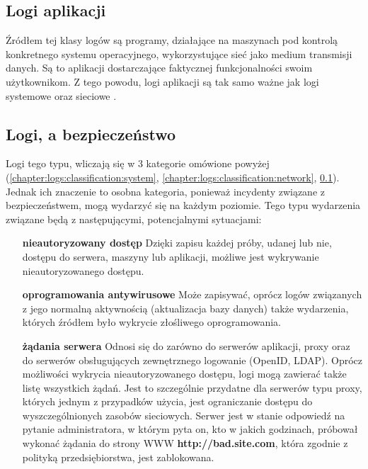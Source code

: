     \subsection{Logi aplikacji}
    \label{chapter:logs:classification:application}
    Źródłem tej klasy logów są programy, działające na maszynach pod kontrolą konkretnego
    systemu operacyjnego, wykorzystujące sieć jako medium transmisji danych. Są to
    aplikacji dostarczające faktycznej funkcjonalności swoim użytkownikom. Z tego powodu,
    logi aplikacji są tak samo ważne jak logi systemowe oraz sieciowe \cite{logging_log_management}. 
    
    \subsection{Logi, a bezpieczeństwo}
    \label{chapter:logs:classification:security}
    Logi tego typu, wliczają się w 3 kategorie omówione powyżej (\ref{chapter:logs:classification:system},
    \ref{chapter:logs:classification:network}, \ref{chapter:logs:classification:application}). Jednak
    ich znaczenie to osobna kategoria, ponieważ incydenty związane z bezpieczeństwem, mogą wydarzyć się
    na każdym poziomie. Tego typu wydarzenia związane będą z następującymi, potencjalnymi sytuacjami:
    \begin{itemize}
        \item[\textbf{nieautoryzowany dostęp}] Dzięki zapisu każdej próby, udanej lub nie, dostępu do serwera,
        maszyny lub aplikacji, możliwe jest wykrywanie nieautoryzowanego dostępu.
        \item[\textbf{oprogramowania antywirusowe}] Może zapisywać, oprócz logów związanych z jego normalną aktywnością
        (aktualizacja bazy danych) także wydarzenia, których źródłem było wykrycie złośliwego oprogramowania.
        \item[\textbf{żądania serwera}] Odnosi się do zarówno do serwerów aplikacji, proxy oraz do serwerów
        obsługujących zewnętrznego logowanie (OpenID, LDAP). Oprócz możliwości wykrycia nieautoryzowanego dostępu, logi mogą zawierać także listę wszystkich żądań. Jest to szczególnie przydatne dla serwerów
        typu proxy, których jednym z przypadków użycia, jest ograniczanie dostępu do wyszczególnionych zasobów
        sieciowych. Serwer jest w stanie odpowiedź na pytanie administratora, w którym pyta on, kto w jakich
        godzinach, próbował wykonać żądania do strony WWW \textbf{http://bad.site.com}, która zgodnie z
        polityką przedsiębiorstwa, jest zablokowana.
    \end{itemize}